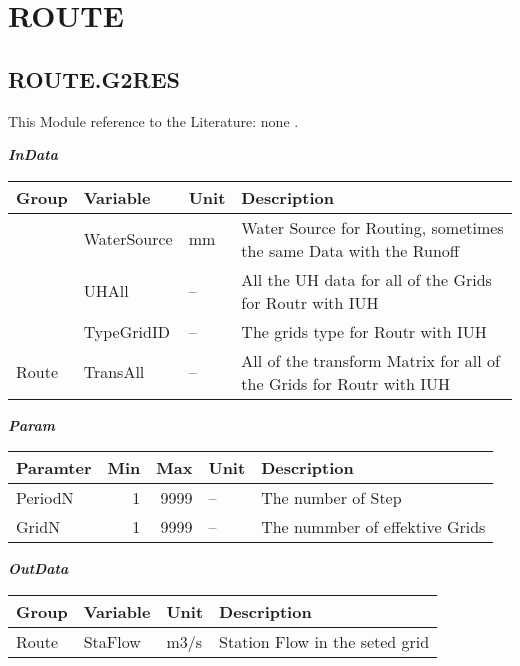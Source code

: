 \documentclass[
]{book}
\begin{document}
\hypertarget{route}{%
\section{ROUTE}\label{route}}

\hypertarget{route.g2res}{%
\subsection{ROUTE.G2RES}\label{route.g2res}}

This Module reference to the Literature: none \citep{none}.

\textbf{\emph{InData}}

\begin{table}[!h]
\centering
\begin{tabular}{l|l|l|l}
\hline
Group & Variable & Unit & Description\\
\hline
 & WaterSource & mm & Water Source for Routing, sometimes the same Data with the Runoff\\
\cline{2-4}
 & UHAll & -- & All the UH data for all of the Grids for Routr with IUH\\
\cline{2-4}
 & TypeGridID & -- & The grids type for Routr with IUH\\
\cline{2-4}
\multirow{-4}{*}{\raggedright\arraybackslash Route} & TransAll & -- & All of the transform Matrix for all of the Grids for Routr with IUH\\
\hline
\end{tabular}
\end{table}

\textbf{\emph{Param}}

\begin{table}[!h]
\centering
\begin{tabular}{l|r|r|l|l}
\hline
Paramter & Min & Max & Unit & Description\\
\hline
PeriodN & 1 & 9999 & -- & The number of Step\\
\cline{1-5}
GridN & 1 & 9999 & -- & The nummber of effektive Grids\\
\hline
\end{tabular}
\end{table}

\textbf{\emph{OutData}}

\begin{table}[!h]
\centering
\begin{tabular}{l|l|l|l}
\hline
Group & Variable & Unit & Description\\
\hline
Route & StaFlow & m3/s & Station Flow in the seted grid\\
\hline
\end{tabular}
\end{table}
\end{document}
